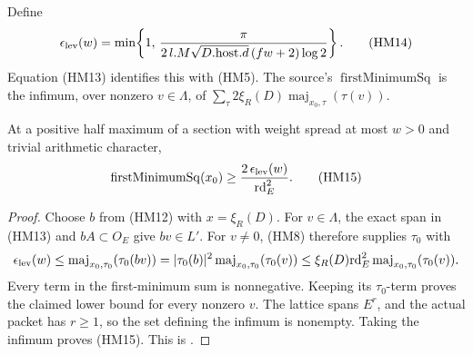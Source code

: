 Define
\[
 \epsilon_{\rm lev}(w)=
 \min\!\left\{1,\,
 {\pi\over2\,l.M\sqrt{D.\mathrm{host}.d}\,
                    (fw+2)\log2}\right\}.
 \tag{HM14}\label{eq:sr-source-epslev}
\]
Equation (HM13) identifies this with (HM5).
The source's \(\operatorname{firstMinimumSq}\) is the infimum,
over nonzero \(v\in\Lambda\), of
\(\sum_\tau 2\xi_R(D)\operatorname{maj}_{x_0,\tau}(\tau(v))\).

\begin{srproposition}\label{prop:sr-source-first-minimum-halfmax}
At a positive half maximum of a section with weight spread at
most \(w>0\) and trivial arithmetic character,
\[
 \operatorname{firstMinimumSq}(x_0)
             \ge {2\,\epsilon_{\rm lev}(w)\over\mathrm{rd}_E^2}.
 \tag{HM15}\label{eq:sr-source-first-minimum}
\]
\end{srproposition}
\begin{proof}
Choose \(b\) from (HM12) with \(x=\xi_R(D)\).
For \(v\in\Lambda\), the exact span in (HM13) and
\(bA\subset O_E\) give \(bv\in L'\).
For \(v\ne0\), (HM8) therefore supplies \(\tau_0\) with
\[
 \epsilon_{\rm lev}(w)
       \le\operatorname{maj}_{x_0,\tau_0}(\tau_0(bv))
       =|\tau_0(b)|^2\operatorname{maj}_{x_0,\tau_0}(\tau_0(v))
       \le\xi_R(D)\mathrm{rd}_E^2
                       \operatorname{maj}_{x_0,\tau_0}(\tau_0(v)).
\]
Every term in the first-minimum sum is nonnegative.
Keeping its \(\tau_0\)-term proves the claimed lower bound for
every nonzero \(v\).
The lattice spans \(E^r\), and the actual packet has \(r\ge1\),
so the set defining the infimum is nonempty.
Taking the infimum proves (HM15).
This is .
\end{proof}

